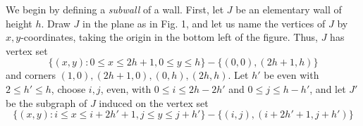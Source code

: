 
We begin by defining a \textit{subwall} of a wall. First, let $J$ be an elementary wall of height $h$. Draw $J$ in the plane as in Fig. 1, and let us name the vertices of $J$ by $x, y$-coordinates, taking the origin in the bottom left of the figure. Thus, $J$ has vertex set
\begin{equation*}
\{(x, y) : 0 \le x \le 2h+1, 0 \le y \le h\} - \{(0, 0), (2h+1, h)\}
\end{equation*}
and corners $(1, 0), (2h+1, 0), (0, h), (2h, h)$. Let $h'$ be even with $2 \le h' \le h$, choose $i, j$, even, with $0 \le i \le 2h - 2h'$ and $0 \le j \le h - h'$, and let $J'$ be the subgraph of $J$ induced on the vertex set
\begin{equation*}
\{(x, y) : i \le x \le i + 2h' + 1, j \le y \le j + h'\} - \{(i, j), (i + 2h' + 1, j + h')\}
\end{equation*}
